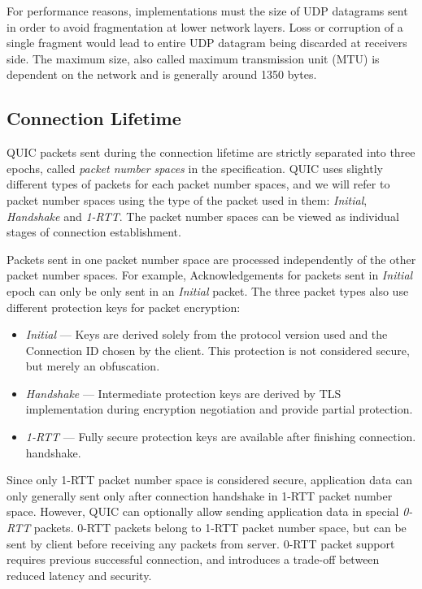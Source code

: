 For performance reasons, implementations must the size of UDP datagrams sent in order to avoid
fragmentation at lower network layers. Loss or corruption of a single fragment would lead to entire
UDP datagram being discarded at receivers side. The maximum size, also called maximum transmission
unit (MTU) is dependent on the network and is generally around 1350 bytes.

\subsection{Connection Lifetime}

QUIC packets sent during the connection lifetime are strictly separated into three epochs, called
\textit{packet number spaces} in the specification. QUIC uses slightly different types of packets
for each packet number spaces, and we will refer to packet number spaces using the type of the
packet used in them: \textit{Initial}, \textit{Handshake} and \textit{1-RTT}. The packet number
spaces can be viewed as individual stages of connection establishment.

Packets sent in one packet number space are processed independently of the other packet number
spaces. For example, Acknowledgements for packets sent in \textit{Initial} epoch can only be only
sent in an \textit{Initial} packet. The three packet types also use different protection keys for
packet encryption:

\begin{itemize}

  \item \textit{Initial} --- Keys are derived solely from the protocol version used and the
    Connection ID chosen by the client. This protection is not considered secure, but merely an
    obfuscation.

  \item \textit{Handshake} --- Intermediate protection keys are derived by TLS implementation during
    encryption negotiation and provide partial protection.

  \item \textit{1-RTT} --- Fully secure protection keys are available after finishing connection.
    handshake.

\end{itemize}

Since only 1-RTT packet number space is considered secure, application data can only generally sent
only after connection handshake in 1-RTT packet number space. However, QUIC can optionally allow
sending application data in special \textit{0-RTT} packets. 0-RTT packets belong to 1-RTT packet
number space, but can be sent by client before receiving any packets from server. 0-RTT packet
support requires previous successful connection, and introduces a trade-off between reduced latency
and security.

